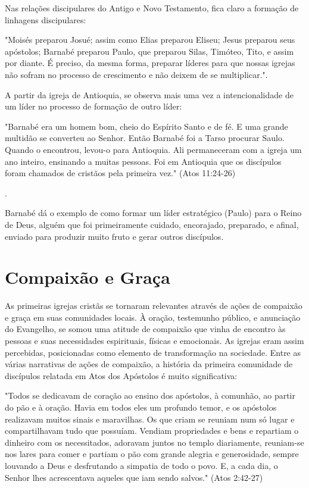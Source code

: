 \documentclass[12pt,openright,oneside,a4paper]{abntex2}
\begin{document}
Nas relações discipulares do Antigo e Novo Testamento, fica claro a formação de linhagens discipulares:  \begin{citacao}"Moisés preparou Josué; assim como Elias preparou Eliseu; Jesus preparou seus apóstolos; Barnabé preparou Paulo, que preparou Silas, Timóteo, Tito, e assim por diante. É preciso, da mesma forma, preparar líderes para que nossas igrejas não sofram no processo de crescimento e não deixem de se multiplicar."\cite[p. 137]{brandao}.\end{citacao}

A partir da igreja de Antioquia, se observa mais uma vez a intencionalidade de um líder no processo de formação de outro líder: \begin{citacao}"Barnabé era um homem bom, cheio do Espírito Santo e de fé. E uma grande multidão se converteu ao Senhor. Então Barnabé foi a Tarso procurar Saulo. Quando o encontrou, levou-o para Antioquia. Ali permaneceram com a igreja um ano inteiro, ensinando a muitas pessoas. Foi em Antioquia que os discípulos foram chamados de cristãos pela primeira vez." (Atos 11:24-26)\end{citacao}.

Barnabé dá o exemplo de como formar um líder estratégico (Paulo) para o Reino de Deus, alguém que foi primeiramente cuidado, encorajado, preparado, e afinal, enviado para produzir muito fruto e gerar outros discípulos.

\section{Compaixão e Graça}

As primeiras igrejas cristãs se tornaram relevantes através de ações de compaixão e graça em suas comunidades locais. À oração, testemunho público, e anunciação do Evangelho, se somou uma atitude de compaixão que vinha de encontro às pessoas e suas necessidades espirituais, físicas e emocionais. As igrejas eram assim percebidas, posicionadas como elemento de transformação na sociedade\cite[p. 165]{brandao}. Entre as várias narrativas de ações de compaixão, a história da primeira comunidade de discípulos relatada em Atos dos Apóstolos é muito significativa: 

\begin{citacao}"Todos se dedicavam de coração ao ensino dos apóstolos, à comunhão, ao partir do pão e à oração. Havia em todos eles um profundo temor, e os apóstolos realizavam muitos sinais e maravilhas. Os que criam se reuniam num só lugar e compartilhavam tudo que possuíam. Vendiam propriedades e bens e repartiam o dinheiro com os necessitados, adoravam juntos no templo diariamente, reuniam-se nos lares para comer e partiam o pão com grande alegria e generosidade, sempre louvando a Deus e desfrutando a simpatia de todo o povo. E, a cada dia, o Senhor lhes acrescentava aqueles que iam sendo salvos." (Atos 2:42-27)\end{citacao}
\end{document}
